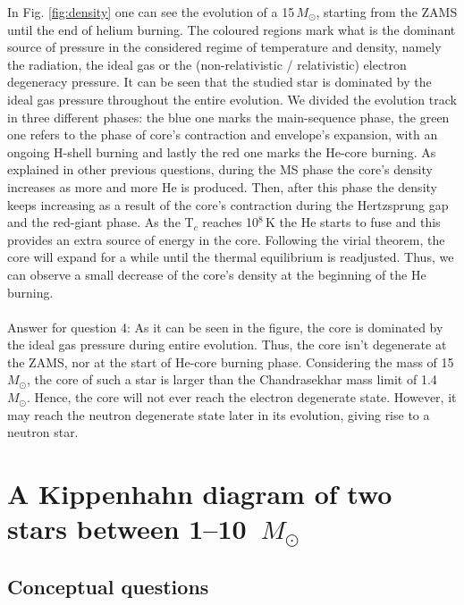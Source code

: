 \documentclass{article}
\newcommand{\msun}{\ensuremath{M_\odot}}
\begin{document}
In Fig. \ref{fig:density} one can see the evolution of a 15\,$\msun$, starting from the ZAMS until the end of helium burning. The coloured regions mark what is the dominant source of pressure in the considered regime of temperature and density, namely the radiation, the ideal gas or the (non-relativistic / relativistic) electron degeneracy pressure. It can be seen that the studied star is dominated by the ideal gas pressure throughout the entire evolution. We divided the evolution track in three different phases: the blue one marks the main-sequence phase, the green one refers to the phase of core's contraction and envelope's expansion, with an ongoing H-shell burning and lastly the red one marks the He-core burning. As explained in other previous questions, during the MS phase the core's density increases as more and more He is produced. Then, after this phase the density keeps increasing as a result of the core's contraction during the Hertzsprung gap and the red-giant phase. As the T$_c$ reaches 10$^8$\,K the He starts to fuse and this provides an extra source of energy in the core. Following the virial theorem, the core will expand for a while until the thermal equilibrium is readjusted. Thus, we can observe a small decrease of the core's density at the beginning of the He burning. 
\\
\\
Answer for question 4: As it can be seen in the figure, the core is dominated by the ideal gas pressure during entire evolution. Thus, the core isn't degenerate at the ZAMS, nor at the start of He-core burning phase. Considering the mass of 15\,$\msun$, the core of such a star is larger than the Chandrasekhar mass limit of 1.4\,$\msun$. Hence, the core will not ever reach the electron degenerate state. However, it may reach the neutron degenerate state later in its evolution, giving rise to a neutron star.


\section{A Kippenhahn diagram of two stars between 1--10~\msun}
\subsection{Conceptual questions}
\end{document}
